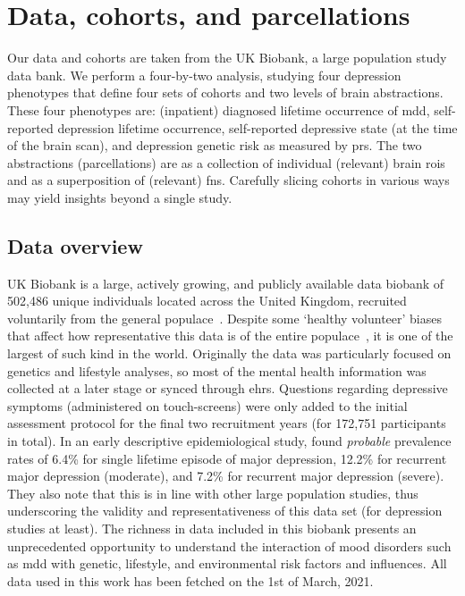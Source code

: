 \clearpage
\section{Data, cohorts, and parcellations}
\label{sec:ukb-data}

Our data and cohorts are taken from the UK Biobank, a large population study data bank.
We perform a four-by-two analysis, studying four depression phenotypes that define four sets of cohorts and two levels of brain abstractions.
These four phenotypes are: (inpatient) diagnosed lifetime occurrence of \gls{mdd}, self-reported depression lifetime occurrence, self-reported depressive state (at the time of the brain scan), and depression genetic risk as measured by \gls{prs}.
The two abstractions (parcellations) are as a collection of individual (relevant) brain \glspl{roi} and as a superposition of (relevant) \glspl{fn}.
Carefully slicing cohorts in various ways may yield insights beyond a single study.

\subsection{Data overview}

UK Biobank is a large, actively growing, and publicly available data biobank of 502,486 unique individuals located across the United Kingdom, recruited voluntarily from the general populace~\parencite{Collins2012, Allen2014b}.
Despite some `healthy volunteer' biases that affect how representative this data is of the entire populace~\parencite[see][]{Fry2017}, it is one of the largest of such kind in the world.
Originally the data was particularly focused on genetics and lifestyle analyses, so most of the mental health information was collected at a later stage or synced through \glspl{ehr}.
Questions regarding depressive symptoms (administered on touch-screens) were only added to the initial assessment protocol for the final two recruitment years (for 172,751 participants in total).
In an early descriptive epidemiological study, \textcite{Smith2013c} found \emph{probable} prevalence rates of 6.4\% for single lifetime episode of major depression, 12.2\% for recurrent major depression (moderate), and 7.2\% for recurrent major depression (severe).
They also note that this is in line with other large population studies, thus underscoring the validity and representativeness of this data set (for depression studies at least).
The richness in data included in this biobank presents an unprecedented opportunity to understand the interaction of mood disorders such as \gls{mdd} with genetic, lifestyle, and environmental risk factors and influences.
All data used in this work has been fetched on the 1st of March, 2021.

